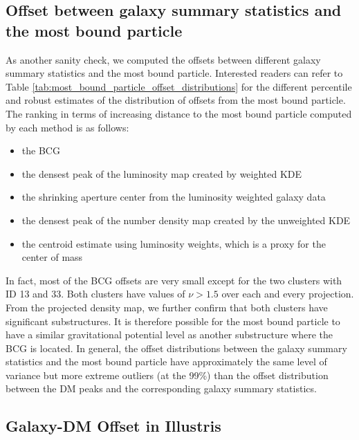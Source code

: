 \subsection{Offset between galaxy summary statistics and the most bound particle}
As another sanity check, we computed the offsets between different galaxy summary
statistics and the most bound particle. 
Interested readers can refer to Table
\ref{tab:most_bound_particle_offset_distributions} for the different
percentile and robust estimates of the distribution of offsets from the most bound 
particle. 
The ranking in terms of increasing distance 
to the most bound particle computed by each method is as follows:
\begin{itemize}
	\item the BCG 
	\item the densest peak of the luminosity map created by weighted KDE 
		\item the shrinking aperture center from the luminosity weighted galaxy data
		\item the densest peak of the number density map created by the unweighted KDE 
		\item the centroid estimate using luminosity weights, which is a proxy for the
			center of mass
\end{itemize}

In fact, most of the BCG offsets are very small except for the two clusters with ID 13
and 33. Both clusters have  values of $\nu > 1.5 $ over each and every projection. 
From the projected density map, we further confirm that
both clusters have significant substructures. It is therefore possible for the
most bound particle to have a similar gravitational potential level as another 
substructure where the BCG is located. 
In general, the offset distributions between the galaxy summary statistics and
the most bound particle have approximately the same level of variance but more
extreme outliers (at the 99\%) than the
offset distribution between the DM peaks and the corresponding galaxy summary
statistics.

\subsection{Galaxy-DM Offset in Illustris}
\label{subsec:galaxyDMoffset}
